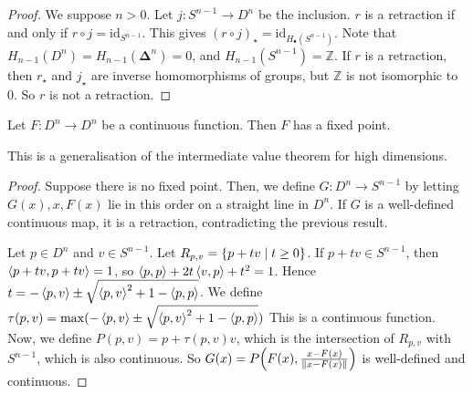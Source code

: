\begin{proof}
	We suppose \( n > 0 \).
	Let \( j \colon S^{n-1} \to D^n \) be the inclusion.
	\( r \) is a retraction if and only if \( r \circ j = \mathrm{id}_{S^{n-1}} \).
	This gives \( (r \circ j)_\star = \mathrm{id}_{H_\bullet(S^{n-1})} \).
	Note that \( H_{n-1}(D^n) = H_{n-1}(\bm\Delta^n) = 0 \), and \( H_{n-1}(S^{n-1}) = \mathbb Z \).
	If \( r \) is a retraction, then \( r_\star \) and \( j_\star \) are inverse homomorphisms of groups, but \( \mathbb Z \) is not isomorphic to \( 0 \).
	So \( r \) is not a retraction.
\end{proof}
\begin{theorem}
	Let \( F \colon D^n \to D^n \) be a continuous function.
	Then \( F \) has a fixed point.
\end{theorem}
\begin{remark}
	This is a generalisation of the intermediate value theorem for high dimensions.
\end{remark}
\begin{proof}
	Suppose there is no fixed point.
	Then, we define \( G \colon D^n \to S^{n-1} \) by letting \( G(x), x, F(x) \) lie in this order on a straight line in \( D^n \).
	If \( G \) is a well-defined continuous map, it is a retraction, contradicting the previous result.

	Let \( p \in D^n \) and \( v \in S^{n-1} \).
	Let \( R_{p,v} = \qty{p + tv \mid t \geq 0} \).
	If \( p + tv \in S^{n-1} \), then \( \left\langle{p + tv, p + tv}\right\rangle = 1 \), so \( \left\langle{p,p}\right\rangle + 2t \left\langle{v,p}\right\rangle + t^2 = 1 \).
	Hence \( t = -\left\langle{p,v}\right\rangle \pm \sqrt{\left\langle{p,v}\right\rangle^2 + 1 - \left\langle{p,p}\right\rangle} \).
	We define \( \tau(p,v) = \max(-\left\langle{p,v}\right\rangle \pm \sqrt{\left\langle{p,v}\right\rangle^2 + 1 - \left\langle{p,p}\right\rangle}) \)
	This is a continuous function.
	Now, we define \( P(p,v) = p + \tau(p,v) v \), which is the intersection of \( R_{p,v} \) with \( S^{n-1} \), which is also continuous.
	So \( G(x) = P\qty(F(x), \frac{x - F(x)}{\norm{x - F(x)}}) \) is well-defined and continuous.
\end{proof}

